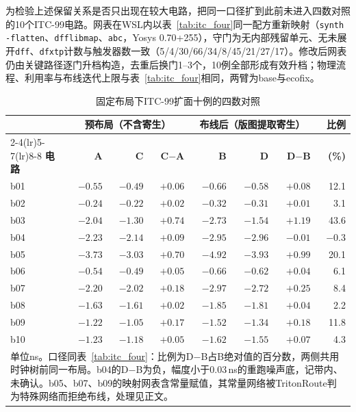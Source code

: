 \documentclass[twocolumn,10pt,fontset=windows]{ctexart}
\begin{document}
为检验上述保留关系是否只出现在较大电路，把同一口径扩到此前未进入四数对照的10个ITC-99电路。网表在WSL内以表~\ref{tab:itc_four}同一配方重新映射（\texttt{synth -flatten}、\texttt{dfflibmap}、\texttt{abc}，Yosys 0.70+255），守门为无内部残留单元、无未展开\texttt{dff}、\texttt{dfxtp}计数与触发器数一致（5/4/30/66/34/8/45/21/27/17）。修改后网表仍由关键路径逐门升档构造，去重后换门1--3个，10例全部形成有效升档；物理流程、利用率与布线迭代上限与表~\ref{tab:itc_four}相同，两臂为base与ecofix。

\begin{table}[htbp]
\centering\caption{固定布局下ITC-99扩面十例的四数对照}\label{tab:itc_ext}
\footnotesize\setlength{\tabcolsep}{3pt}
\begin{tabular}{lrrrrrrr}
\toprule
 & \multicolumn{3}{c}{\textbf{预布局（不含寄生）}} & \multicolumn{3}{c}{\textbf{布线后（版图提取寄生）}} & \textbf{比例}\\
\cmidrule(lr){2-4}\cmidrule(lr){5-7}\cmidrule(lr){8-8}
\textbf{电路} & \textbf{A} & \textbf{C} & \textbf{C$-$A} & \textbf{B} & \textbf{D} & \textbf{D$-$B} & \textbf{(\%)}\\
\midrule
b01 & $-0.55$ & $-0.49$ & $+0.06$ & $-0.66$ & $-0.58$ & $+0.08$ & 12.1\\
b02 & $-0.24$ & $-0.22$ & $+0.02$ & $-0.32$ & $-0.31$ & $+0.01$ & 3.1\\
b03 & $-2.04$ & $-1.30$ & $+0.74$ & $-2.73$ & $-1.54$ & $+1.19$ & 43.6\\
b04 & $-2.23$ & $-2.14$ & $+0.09$ & $-2.95$ & $-2.96$ & $-0.01$ & $-0.3$\\
b05 & $-3.73$ & $-3.03$ & $+0.70$ & $-4.92$ & $-3.93$ & $+0.99$ & 20.1\\
b06 & $-0.54$ & $-0.49$ & $+0.05$ & $-0.66$ & $-0.62$ & $+0.04$ & 6.1\\
b07 & $-2.20$ & $-2.02$ & $+0.18$ & $-2.97$ & $-2.72$ & $+0.25$ & 8.4\\
b08 & $-1.63$ & $-1.61$ & $+0.02$ & $-1.85$ & $-1.81$ & $+0.04$ & 2.2\\
b09 & $-1.22$ & $-1.05$ & $+0.17$ & $-1.52$ & $-1.34$ & $+0.18$ & 11.8\\
b10 & $-1.23$ & $-1.18$ & $+0.05$ & $-1.62$ & $-1.55$ & $+0.07$ & 4.3\\
\bottomrule
\multicolumn{8}{p{0.95\columnwidth}}{\footnotesize 单位ns。口径同表~\ref{tab:itc_four}：比例为D$-$B占B绝对值的百分数，两侧共用时钟树前同一布局。b04的D$-$B为负，幅度小于0.03\,ns的重跑噪声底，记带内、未确认。b05、b07、b09的映射网表含常量赋值，其常量网络被TritonRoute判为特殊网络而拒绝布线，处理见正文。}\\
\end{tabular}
\end{table}
\end{document}
